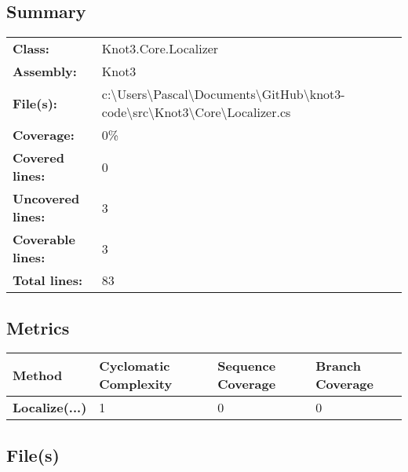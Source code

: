 \documentclass[a4paper,10pt]{article}
\begin{document}
\subsection{Summary}
\begin{longtable}[l]{ll}
\textbf{Class:} & Knot3.Core.Localizer\\
\textbf{Assembly:} & Knot3\\
\textbf{File(s):} & \begin{minipage}[t]{12cm}{c:\textbackslash Users\textbackslash Pascal\textbackslash Documents\textbackslash GitHub\textbackslash knot3-code\textbackslash src\textbackslash Knot3\textbackslash Core\textbackslash Localizer.cs}\end{minipage} \\
\textbf{Coverage:} & 0\%\\
\textbf{Covered lines:} & 0\\
\textbf{Uncovered lines:} & 3\\
\textbf{Coverable lines:} & 3\\
\textbf{Total lines:} & 83\\
\end{longtable}
\subsection{Metrics}
\begin{longtable}[l]{|l|l|l|l|}
\hline
\textbf{Method} & \textbf{Cyclomatic Complexity} & \textbf{Sequence Coverage} & \textbf{Branch Coverage}\\
\hline
\textbf{Localize(...)} & 1 & 0 & 0\\
\hline
\end{longtable}
\subsection{File(s)}
\end{document}
